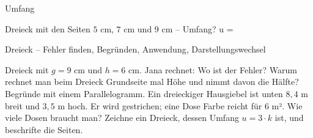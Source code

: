 \begin{aufgabe}{Umfang}
\begin{teile}
\teil Dreieck mit den Seiten $5$ cm, $7$ cm und $9$ cm – Umfang? u = \leerfeld[cm]
\end{teile}
\end{aufgabe}

\begin{aufgabe}{Dreieck – Fehler finden, Begründen, Anwendung, Darstellungswechsel}
\begin{teile}
\teil Dreieck mit $g = 9$ cm und $h = 6$ cm. Jana rechnet:  Wo ist der Fehler?
\teil Warum rechnet man beim Dreieck Grundseite mal Höhe und nimmt davon die Hälfte? Begründe mit einem Parallelogramm.
\teil Ein dreieckiger Hausgiebel ist unten $8{,}4$ m breit und $3{,}5$ m hoch. Er wird gestrichen; eine Dose Farbe reicht für $6$ m². Wie viele Dosen braucht man?
\teil Zeichne ein Dreieck, dessen Umfang $u = 3 \cdot k$ ist, und beschrifte die Seiten.

\end{teile}
\end{aufgabe}
